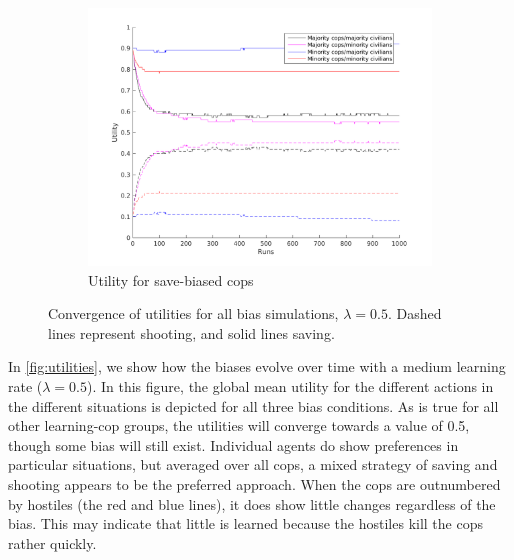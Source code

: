 \begin{figure}[H]
\begin{subfigure}[b]{0.62\textwidth}
        \includegraphics[width=\textwidth]{./pictures/Utility05BiasSave}
        \caption{Utility for save-biased cops }
        \label{fig:utSave}
    \end{subfigure}
\caption{Convergence of utilities for all bias simulations, $\lambda = 0.5$. Dashed lines represent shooting, and solid lines saving. }
\label{fig:utilities}
\end{figure}
In \autoref{fig:utilities}, we show how the biases evolve over time with a medium learning rate ($\lambda = 0.5$). In this figure, the global mean utility for the different actions in the different situations is depicted for all three bias conditions. As is true for all other learning-cop groups, the utilities will converge towards a value of 0.5, though some bias will still exist. Individual agents do show preferences in particular situations, but averaged over all cops, a mixed strategy of saving and shooting appears to be the preferred approach. When the cops are outnumbered by hostiles (the red and blue lines), it does show little changes regardless of the bias. This may indicate that little is learned because the hostiles kill the cops rather quickly. 

